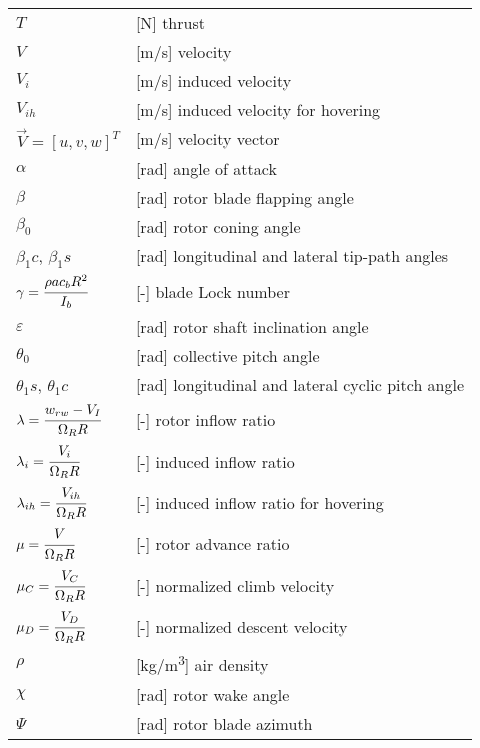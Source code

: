 \begin{longtable}[l]{ l p{} }
  $T$                                        & [N] thrust \\
  $V$                                        & [m/s] velocity \\
  $V_i$                                      & [m/s] induced velocity \\
  $V_{ih}$                                   & [m/s] induced velocity for hovering \\
  $\vec V=\left[ u, v, w \right]^T$          & [m/s] velocity vector \\
  $\alpha$                                   & [rad] angle of attack \\
  $\beta$                                    & [rad] rotor blade flapping angle \\
  $\beta_0$                                  & [rad] rotor coning angle \\
  $\beta_1c$, $\beta_1s$                     & [rad] longitudinal and lateral tip-path angles \\
  $\gamma=\cfrac{\rho a c_b R^2}{I_b}$       & [-] blade Lock number \\
  $\varepsilon$                              & [rad] rotor shaft inclination angle \\
  $\theta_0$                                 & [rad] collective pitch angle \\
  $\theta_1s$, $\theta_1c$                   & [rad] longitudinal and lateral cyclic pitch angle \\
  $\lambda=\cfrac{w_{rw} - V_I}{\Omega_R R}$ & [-] rotor inflow ratio \\
  $\lambda_i=\cfrac{V_i}{\Omega_R R}$        & [-] induced inflow ratio \\
  $\lambda_{ih}=\cfrac{V_{ih}}{\Omega_R R}$  & [-] induced inflow ratio for hovering \\
  $\mu=\cfrac{V}{\Omega_R R}$                & [-] rotor advance ratio \\
  $\mu_C=\cfrac{V_C}{\Omega_R R}$            & [-] normalized climb velocity \\
  $\mu_D=\cfrac{V_D}{\Omega_R R}$            & [-] normalized descent velocity \\
  $\rho$                                     & [kg/m\textsuperscript{3}] air density \\
  $\chi$                                     & [rad] rotor wake angle \\
  $\Psi$                                     & [rad] rotor blade azimuth \\

\end{longtable}
